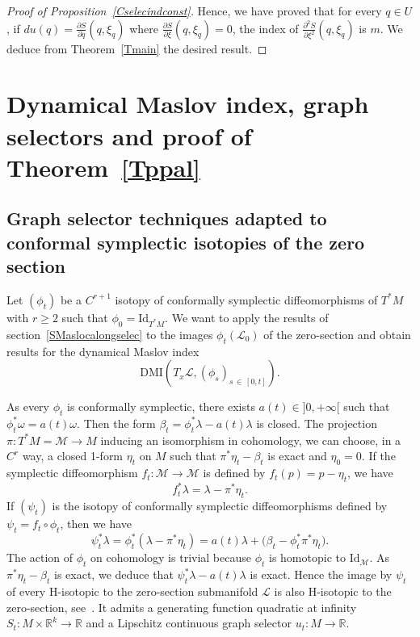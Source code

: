 \documentclass[AHL, Unicode, longabstracts, published]{cedram}
\newcommand*\M{\mathcal{M}}
\newcommand*\cl{\mathcal{L}}
\newcommand{\rId}{\mathrm{Id}}
\newcommand{\DMI}{\mathrm{DMI}}
\newcommand*\R{\mathbb{R}}
\begin{document}
\begin{proof}[Proof of Proposition~\ref{Cselecindconst}]
Hence, we have proved that for every $q\in U$, if $du(q)=\frac{\partial S}{\partial q}(q, \xi_q)$ where $\frac{\partial S}{\partial \xi}(q, \xi_q)=0$, the index of $\frac{\partial^2 S}{\partial \xi^2}(q, \xi_q)$ is $m$. We deduce from Theorem~\ref{Tmain} the desired result.
\end{proof}


\section{Dynamical Maslov index, graph selectors and proof of Theorem~\ref{Tppal}}\label{section heart}


\subsection{Graph selector techniques adapted to conformal symplectic isotopies of the zero section}\label{exactification}

Let $(\phi_t)$ be a $C^{r+1}$ isotopy of conformally symplectic diffeomorphisms of $T^*M$ with $r\geq 2$ such that $\phi_0=\rId_{T^*M}$. We want to apply the results of section~\ref{SMaslocalongselec} to the images $\phi_t(\cl_0)$ of the zero-section and obtain results for the dynamical Maslov index
\[
\DMI\left(T_x\cl,(\phi_s)_{s\,\in\,[0,t]}\right).
\]



As every $\phi_t$ is conformally symplectic, there exists $a(t)\in]0, +\infty[$ such that $\phi_t^*\omega=a(t)\omega$. Then the form $\beta_t=\phi_t^*\lambda-a(t)\lambda$ is closed. The projection $\pi: T^*M=\M\rightarrow M$ inducing an isomorphism in cohomology, we can choose, in a $C^{r}$ way, a closed 1-form $\eta_t$ on $M$ such that $\pi^*\eta_t-\beta_t$ is exact { and $\eta_0=0$}. If the symplectic diffeomorphism $f_t:\M\rightarrow \M$ is defined by $f_t(p)=p-\eta_t$, we have
\[
f_t^*\lambda=\lambda-\pi^*\eta_t.
\]
If $(\psi_t)$ is the isotopy of conformally symplectic diffeomorphisms defined by $\psi_t=f_t\circ\phi_t $, then we have
\[
\psi_t^*\lambda=\phi_t^*(\lambda-\pi^*\eta_t)=a(t)\lambda + \Big(\beta_t-\phi_t^*\pi^*\eta_t\Big).
\]
The action of $\phi_t$ on cohomology is trivial because $\phi_t$ is homotopic to $\rId_{\M}$. As $\pi^*\eta_t-\beta_t$ is exact, we deduce that $\psi_t^*\lambda-a(t)\lambda$ is exact. Hence the image by $\psi_t$ of every H-isotopic to the zero-section submanifold $\cl$ is also H-isotopic to the zero-section, see~\cite[Corollary~3]{ArnFej21}. It admits a generating function quadratic at infinity $S_t:M\times\R^k\rightarrow \R$ and a Lipschitz continuous graph selector $u_t:M\rightarrow \R$.
\end{document}
